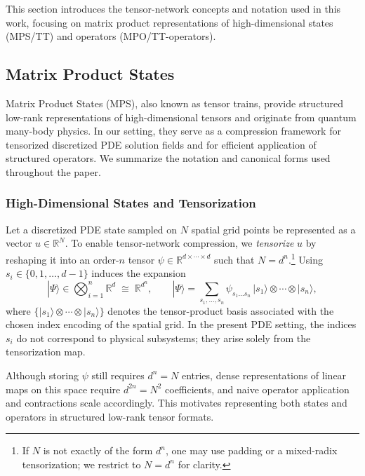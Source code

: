 \documentclass[letterpaper, 10 pt, conference]{ieeeconf}  %
\begin{document}
This section introduces the tensor-network concepts and notation used in this
work, focusing on matrix product representations of high-dimensional states
(MPS/TT) and operators (MPO/TT-operators).

\subsection{Matrix Product States}

Matrix Product States (MPS), also known as tensor trains, provide structured
low-rank representations of high-dimensional tensors and originate from
quantum many-body physics. In our setting, they serve as a compression
framework for tensorized discretized PDE solution fields and for efficient
application of structured operators. We summarize the notation and canonical
forms used throughout the paper.

\subsubsection{High-Dimensional States and Tensorization}

Let a discretized PDE state sampled on $N$ spatial grid points be represented
as a vector $u \in \mathbb{R}^{N}$. To enable tensor-network compression, we
\emph{tensorize} $u$ by reshaping it into an order-$n$ tensor
$\psi \in \mathbb{R}^{d \times \cdots \times d}$ such that $N = d^n$.\footnote{
If $N$ is not exactly of the form $d^n$, one may use padding or a mixed-radix
tensorization; we restrict to $N=d^n$ for clarity.}
Using $s_i \in \{0,1,\dots,d-1\}$ induces the expansion
\begin{equation*}
|\Psi\rangle
\in \bigotimes_{i=1}^{n} \mathbb{R}^{d}
\;\cong\; \mathbb{R}^{d^n},
\qquad
|\Psi\rangle
= \sum_{s_1,\dots,s_n}
\psi_{s_1 \dots s_n}\, |s_1\rangle \otimes \cdots \otimes |s_n\rangle,
\end{equation*}
where $\{|s_1\rangle \otimes \cdots \otimes |s_n\rangle\}$ denotes the
tensor-product basis associated with the chosen index encoding of the spatial
grid. In the present PDE setting, the indices $s_i$ do not correspond to
physical subsystems; they arise solely from the tensorization map.

Although storing $\psi$ still requires $d^n = N$ entries, dense representations
of linear maps on this space require $d^{2n} = N^2$ coefficients, and naive
operator application and contractions scale accordingly. This motivates representing both states and operators in structured low-rank tensor formats.
\end{document}
